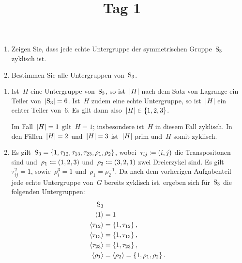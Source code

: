 \documentclass{scrartcl}
\title{\vspace{-1em}Tag 1}
\author{}
\date{}
\begin{document}
\maketitle
\vspace{-7em}


\begin{exercise}
  \begin{enumerate}
    \item
      Zeigen Sie, dass jede echte Untergruppe der symmetrischen Gruppe~$\operatorname{S}_3$ zyklisch ist.
    \item
      Bestimmen Sie alle Untergruppen von~$\operatorname{S}_3$.
  \end{enumerate}
\end{exercise}

\begin{solution}
  \begin{enumerate}
    \item
      Ist~$H$ eine Untergruppe von~$\operatorname{S}_3$, so ist~$\lvert H\rvert$ nach dem Satz von Lagrange ein Teiler von~$\lvert\operatorname{S}_3\rvert = 6$.
      Ist~$H$ zudem eine echte Untergruppe, so ist~$\lvert H\rvert$ ein echter Teiler von~$6$.
      Es gilt dann also~$\lvert H\rvert \in \{1, 2, 3\}$.

      Im Fall~$\lvert H\rvert = 1$ gilt~$H = 1$;
      insbesondere ist~$H$ in diesem Fall zyklisch.
      In den Fällen~$\lvert H\rvert = 2$ und~$\lvert H\rvert = 3$ ist~$\lvert H\rvert$ prim und~$H$ somit zyklisch.
    \item
      Es gilt~$\operatorname{S}_3 = \{ 1, \tau_{12}, \tau_{13}, \tau_{23}, \rho_1, \rho_2 \}$, wobei~$\tau_{ij} \coloneqq (i,j)$ die Transpositonen sind und~$\rho_1 \coloneqq (1, 2, 3)$ und~$\rho_2 \coloneqq (3, 2, 1)$ zwei Dreierzykel sind.
      Es gilt~$\tau_{ij}^2 = 1$, sowie~$\rho_i^3 = 1$ und~$\rho_1 = \rho_2^{-1}$.
      Da nach dem vorherigen Aufgabenteil jede echte Untergruppe von~$G$ bereits zyklisch ist, ergeben sich für~$\operatorname{S}_3$ die folgenden Untergruppen:
      \begin{align*}
        \operatorname{S}_3 &{} {}
        \\
        \langle1\rangle &= 1
        \\
        \langle \tau_{12} \rangle &= \{ 1, \tau_{12} \} \,,
        \\
        \langle \tau_{13} \rangle &= \{ 1, \tau_{13} \} \,,
        \\
        \langle \tau_{23} \rangle &= \{ 1, \tau_{23} \} \,,
        \\
        \langle \rho_1 \rangle &= \langle \rho_2 \rangle = \{ 1, \rho_1, \rho_2 \} \,.
      \end{align*}
  \end{enumerate}
\end{solution}
\end{document}
